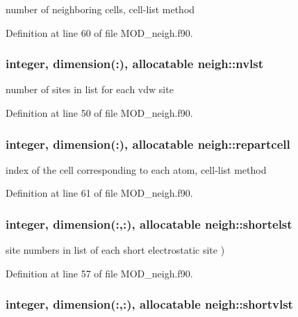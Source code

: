 number of neighboring cells, cell-\/list method 



Definition at line 60 of file M\-O\-D\-\_\-neigh.\-f90.

\hypertarget{classneigh_ab1ecf3ee54d3ed5950574b699190e028}{
\subsubsection[{nvlst}]{\setlength{\rightskip}{0pt plus 5cm}integer, dimension(\-:), allocatable neigh\-::nvlst}}\label{classneigh_ab1ecf3ee54d3ed5950574b699190e028}


number of sites in list for each vdw site 



Definition at line 50 of file M\-O\-D\-\_\-neigh.\-f90.

\hypertarget{classneigh_afdbbe58473ef898932aab7d864ac620d}{
\subsubsection[{repartcell}]{\setlength{\rightskip}{0pt plus 5cm}integer, dimension(\-:), allocatable neigh\-::repartcell}}\label{classneigh_afdbbe58473ef898932aab7d864ac620d}


index of the cell corresponding to each atom, cell-\/list method 



Definition at line 61 of file M\-O\-D\-\_\-neigh.\-f90.

\hypertarget{classneigh_a24094fcb31131c89f6818c5667e6252f}{
\subsubsection[{shortelst}]{\setlength{\rightskip}{0pt plus 5cm}integer, dimension(\-:,\-:), allocatable neigh\-::shortelst}}\label{classneigh_a24094fcb31131c89f6818c5667e6252f}


site numbers in list of each short electrostatic site ) 



Definition at line 57 of file M\-O\-D\-\_\-neigh.\-f90.

\hypertarget{classneigh_ab62999202e9b876b405ddc2463ed38bc}{
\subsubsection[{shortvlst}]{\setlength{\rightskip}{0pt plus 5cm}integer, dimension(\-:,\-:), allocatable neigh\-::shortvlst}}\label{classneigh_ab62999202e9b876b405ddc2463ed38bc}


